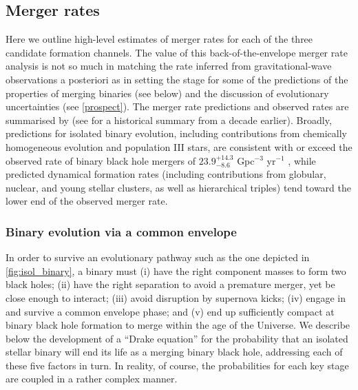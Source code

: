 \documentclass[review]{elsarticle}
\begin{document}
\subsection{Merger rates}

Here we outline high-level estimates of merger rates for each of the three candidate formation channels. The value of this back-of-the-envelope merger rate analysis is not so much in matching the rate inferred from gravitational-wave observations a posteriori as in setting the stage for some of the predictions of the properties of merging binaries (see below) and the discussion of evolutionary uncertainties (see \autoref{prospect}).  The merger rate predictions and observed rates are summarised by \cite{MandelBroekgaarden:2021} (see \cite{ratesdoc} for a historical summary from a decade earlier).  Broadly, predictions for isolated binary evolution, including contributions from chemically homogeneous evolution and population III stars, are consistent with or exceed the observed rate of binary black hole mergers of $23.9^{+14.3}_{-8.6}$ Gpc$^{-3}$ yr$^{-1}$ \citep{GWTC2:pop}, while  predicted dynamical formation rates (including contributions from globular, nuclear, and young stellar clusters, as well as hierarchical triples) tend toward the lower end of the observed merger rate.

\subsubsection{Binary evolution via a common envelope}\label{sec:CErates}

In order to survive an evolutionary pathway such as the one depicted in \autoref{fig:isol_binary}, a binary must (i) have the right component masses to form two black holes; (ii) have the right separation to avoid a premature merger, yet be close enough to interact; (iii) avoid disruption by supernova kicks; (iv) engage in and survive a common envelope phase; and (v) end up sufficiently compact at binary black hole formation to merge within the age of the Universe. We describe below the development of a ``Drake equation'' for the probability that an isolated stellar binary will end its life as a merging binary black hole, addressing each of these five factors in turn.   In reality, of course, the probabilities for each key stage are coupled in a rather complex manner.
\end{document}
